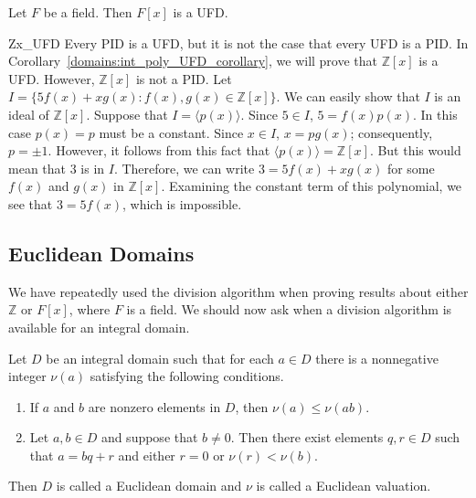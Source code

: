 \begin{corollary}
Let $F$ be a field.  Then $F[x]$ is a UFD.
\end{corollary}

\begin{example}{Zx_UFD}
Every PID is a UFD, but it is not the case that every UFD is a PID. In Corollary~\ref{domains:int_poly_UFD_corollary}, we will prove that ${\mathbb Z}[x]$ is a UFD.  However,
${\mathbb Z}[x]$ is not a PID.  Let $I = \{ 5 f(x) + x g(x) : f(x), g(x)  \in {\mathbb Z}[x] \}$.  We can easily show that $I$ is an ideal of 
${\mathbb Z}[x]$.  Suppose that $I = \langle p(x) \rangle$.  Since $5 \in I$,  $5 = f(x) p(x)$.  In this case $p(x) = p$ must be a constant.  Since $x  \in I$, $x = p g(x)$; consequently, $p = \pm 1$. However, it follows from this fact that $\langle p(x) \rangle = {\mathbb Z}[x]$. But this would 
mean that 3 is in $I$. Therefore, we can write $3 = 5 f(x) + x g(x)$ for  some $f(x)$ and $g(x)$ in ${\mathbb Z}[x]$.  Examining the constant term of  this polynomial, we see that $3 = 5 f(x)$, which is impossible. 
\end{example}


\subsection*{Euclidean Domains}

We have repeatedly used the division algorithm when proving results about either ${\mathbb Z}$ or $F[x]$, where $F$ is a field.  We
should now ask when a division algorithm is available for an integral domain. 

Let $D$ be an integral domain such that for each $a \in D$ there is  a nonnegative integer $\nu(a)$\label{notevaluation} satisfying the
following conditions. 
\begin{enumerate}
 
\item
If $a$ and $b$ are nonzero elements in $D$, then $\nu(a) \leq \nu(ab)$.  
 
\item
Let $a, b \in D$ and suppose that $b \neq 0$. Then there exist elements $q, r \in D$ such that $a = bq +r$ and either $r=0$ or
$\nu(r) < \nu(b)$. 
 
\end{enumerate}
Then $D$ is called a {\bfi Euclidean domain\/} and $\nu$ is called a {\bfi Euclidean valuation}.  


